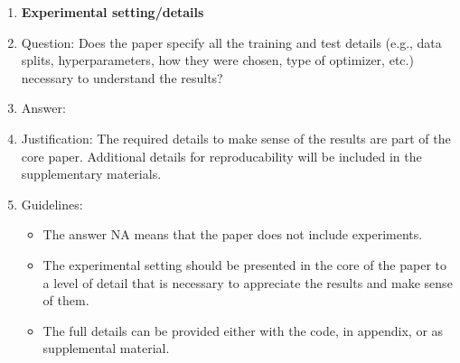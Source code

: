 \documentclass{article}
\begin{document}
\begin{enumerate}
\item {\bf Experimental setting/details}
    \item[] Question: Does the paper specify all the training and test details (e.g., data splits, hyperparameters, how they were chosen, type of optimizer, etc.) necessary to understand the results?
    \item[] Answer: \answerYes{} %
    \item[] Justification: The required details to make sense of the results are part of the core paper. Additional details for reproducability will be included in the supplementary materials.
    \item[] Guidelines:
    \begin{itemize}
        \item The answer NA means that the paper does not include experiments.
        \item The experimental setting should be presented in the core of the paper to a level of detail that is necessary to appreciate the results and make sense of them.
        \item The full details can be provided either with the code, in appendix, or as supplemental material.
    \end{itemize}


\end{enumerate}
\end{document}
